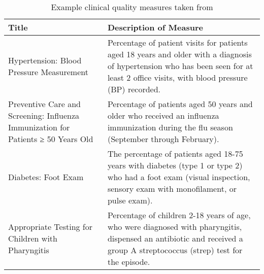 \begin{table}
	\begin{tabular}{ |p{5cm}|p{12.5cm}| }
		\hline
		\textbf{Title} & \textbf{Description of Measure} \\
		\hline
		Hypertension: Blood Pressure Measurement & Percentage of patient visits for patients aged 18 years and older with a diagnosis of hypertension who has been seen for at least 2 office visits, with blood pressure (BP) recorded. \\
		\hline
		Preventive Care and Screening: Influenza Immunization for Patients ≥ 50 Years Old & Percentage of patients aged 50 years and older who received an influenza immunization during the flu season (September through February). \\
		\hline
		Diabetes: Foot Exam & The percentage of patients aged 18-75 years with diabetes (type 1 or type 2) who had a foot exam (visual inspection, sensory exam with monofilament, or pulse exam). \\
		\hline
		Appropriate Testing for Children with Pharyngitis & Percentage of children 2-18 years of age, who were diagnosed with pharyngitis, dispensed an antibiotic and received a group A streptococcus (strep) test for the episode. \\
		
		\hline
		\end{tabular}
		\caption[Table caption text]{Example clinical quality measures taken from \cite{cqm-pdf}}
		\label{table:cqm}
\end{table}
